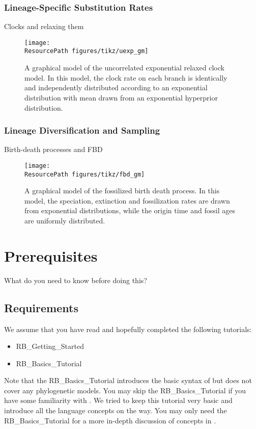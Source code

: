 \subsubsection{Lineage-Specific Substitution Rates}

Clocks \citep{Zuckerkandl1962} and relaxing them 

\begin{figure}[h!]
\centering
\texttt{[image: \\ResourcePath figures/tikz/uexp\_gm]}
\caption{\small A graphical model of the uncorrelated exponential relaxed clock model. In this model, the clock rate on each branch is identically and independently distributed according to an exponential distribution with mean drawn from an exponential hyperprior distribution. }
\label{fig:uexp_gm}
\end{figure}

\subsubsection{Lineage Diversification and Sampling}

Birth-death processes and FBD

\begin{figure}[h!]
\centering
\texttt{[image: \\ResourcePath figures/tikz/fbd\_gm]}
\caption{\small A graphical model of the fossilized birth death process. In this model, the speciation, extinction and fossilization rates are drawn from exponential distributions, while the origin time and fossil ages are uniformly distributed. }
\label{fig:fbd_gm}
\end{figure}

\section{Prerequisites}

What do you need to know before doing this?

\subsection{Requirements}
We assume that you have read and hopefully completed the following tutorials:
\begin{itemize}
\item RB\_Getting\_Started
\item RB\_Basics\_Tutorial
\end{itemize}
Note that the RB\_Basics\_Tutorial introduces the basic syntax of \Rev but does not cover any phylogenetic models.
You may skip the RB\_Basics\_Tutorial if you have some familiarity with \R.
We tried to keep this tutorial very basic and introduce all the language concepts on the way.
You may only need the RB\_Basics\_Tutorial for a more in-depth discussion of concepts in \Rev.




